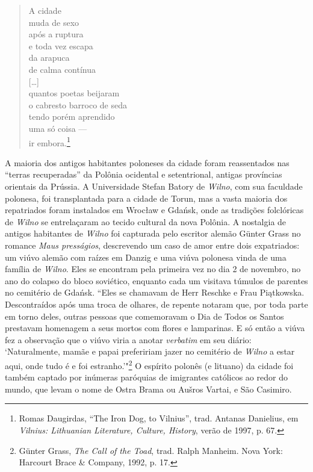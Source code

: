 \begin{verse}
A cidade\\
muda de sexo\\
após a ruptura\\
e toda vez escapa\\
da arapuca\\
de calma contínua\\
\smallskip
{[}\ldots{}{]}\\
\smallskip
quantos poetas beijaram\\
o cabresto barroco de seda\\
tendo porém aprendido\\
uma só coisa ---\\
ir embora.\footnote{Romas Daugirdas, ``The Iron Dog, to Vilnius'', trad. Antanas Danielius, em \textit{Vilnius: Lithuanian Literature, Culture, History}, verão de 1997, p. 67.} 
\end{verse}

A maioria dos antigos habitantes poloneses da cidade foram reassentados
nas ``terras recuperadas'' da Polônia ocidental e setentrional, antigas
províncias orientais da Prússia. A Universidade Stefan Batory de \textit{Wilno},
com sua faculdade polonesa, foi transplantada para a cidade de Torun,
mas a vasta maioria dos repatriados foram instalados em Wrocław e
Gdańsk, onde as tradições folclóricas de \textit{Wilno} se entrelaçaram ao tecido
cultural da nova Polônia. A nostalgia de antigos habitantes de \textit{Wilno} foi
capturada pelo escritor alemão Günter Grass no romance \textit{Maus
presságios}, descrevendo um caso de amor entre dois expatriados: um
viúvo alemão com raízes em Danzig e uma viúva polonesa vinda de uma
família de \textit{Wilno}. Eles se encontram pela primeira vez no dia 2 de
novembro, no ano do colapso do bloco soviético, enquanto cada um
visitava túmulos de parentes no cemitério de Gdańsk. ``Eles se chamavam
de Herr Reschke e Frau Piątkowska. Descontraídos após uma troca de
olhares, de repente notaram que, por toda parte em torno deles, outras
pessoas que comemoravam o Dia de Todos os Santos prestavam homenagem a
seus mortos com flores e lamparinas. E só então a viúva fez a observação
que o viúvo viria a anotar \textit{verbatim} em seu diário: `Naturalmente,
mamãe e papai prefeririam jazer no cemitério de \textit{Wilno} a estar aqui, onde
tudo é e foi estranho.'"\footnote{Günter Grass, \textit{The Call of the Toad}, trad. Ralph Manheim. Nova York: Harcourt Brace \& Company, 1992, p. 17.} O espírito polonês (e lituano) da cidade foi também captado por inúmeras paróquias de imigrantes católicos ao redor do mundo, que
levam o nome de Ostra Brama ou Aušros Vartai, e São Casimiro.

